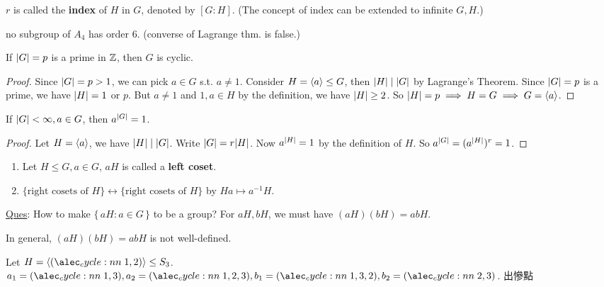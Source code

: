 \begin{remark}
  $r$ is called the {\bf index} of $H$ in $G$, denoted by $[G:H]$.
  (The concept of index can be extended to infinite $G, H$.)
\end{remark}

\begin{exercise}
  no subgroup of $A_4$ has order $6$.
  (converse of Lagrange thm. is false.)
\end{exercise}

\begin{coro}
  If $\lvert G\rvert = p$ is a prime in $\mathbb{Z}$, then $G$ is cyclic.
  \begin{proof}
    Since $\lvert G\rvert = p > 1$, we can pick $a \in G$ s.t. $a \ne 1$.
    Consider $H = \langle a\rangle \le G$, then $\lvert H\rvert \mid \lvert G\rvert$ by Lagrange's Theorem.
    Since $\lvert G\rvert = p$ is a prime, we have $\lvert H\rvert = 1$ or $p$.
    But $a \ne 1$ and $1, a \in H$ by the definition, we have $\lvert H\rvert \ge 2$.
    So $\lvert H\rvert = p \implies H = G \implies G = \langle a\rangle$.
  \end{proof}
\end{coro}

\begin{coro}
  If $\lvert G\rvert < \infty, a \in G$, then $a^{\lvert G\rvert} = 1$.
  \begin{proof}
    Let $H = \langle a\rangle$, we have $\lvert H\rvert \mid \lvert G\rvert$. Write $\lvert G\rvert = r \lvert H\rvert$.
    Now $a^{\lvert H\rvert} = 1$ by the definition of $H$. So
    $a^{\lvert G\rvert} = (a^{\lvert H\rvert})^r = 1$.
  \end{proof}
\end{coro}

\begin{remark} \mbox{}
  \begin{enumerate}
    \item Let $H \le G, a \in G$, $aH$ is called a {\bf left coset}.
    \item $\{ \text{right cosets of $H$} \} \leftrightarrow
      \{ \text{right cosets of $H$} \}$ by $Ha \mapsto a^{-1}H$.
  \end{enumerate}
\end{remark}

\underline{Ques}: How to make $\{\, aH : a \in G \,\}$ to be a group?
For $aH, bH$, we must have $(aH)(bH) = abH$.

In general, $(aH)(bH) = abH$ is not well-defined.

\begin{example}
  Let $H = \gen{\cycle{1,2}} \le S_3$. $a_1 = \cycle{1,3}, a_2 = \cycle{1,2,3},
b_1 = \cycle{1,3,2}, b_2 = \cycle{2,3}$. 出慘點
\end{example}

